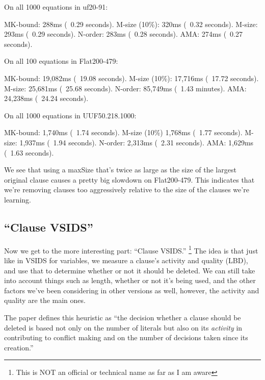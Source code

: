 \documentclass[../main.tex]{subfiles}
\begin{document}
\begin{FVerbatim}
On all 1000 equations in uf20-91:

MK-bound:       288ms (~0.29 seconds).
M-size (10\%):  320ms (~0.32 seconds).
M-size:         293ms (~0.29 seconds).
N-order:        283ms (~0.28 seconds).
AMA:            274ms (~0.27 seconds).

On all 100 equations in Flat200-479:

MK-bound:       19,082ms (~19.08 seconds).
M-size (10\%):  17,716ms (~17.72 seconds).
M-size:         25,681ms (~25.68 seconds).
N-order:        85,749ms (~1.43 minutes).
AMA:            24,238ms (~24.24 seconds).

On all 1000 equations in UUF50.218.1000:

MK-bound:       1,740ms (~1.74 seconds).
M-size (10\%)   1,768ms (~1.77 seconds).
M-size:         1,937ms (~1.94 seconds).
N-order:        2,313ms (~2.31 seconds).
AMA:            1,629ms (~1.63 seconds).
\end{FVerbatim}
\noindent
We see that using a maxSize that's twice as large as the size of the largest original clause
causes a pretty big slowdown on Flat200-479. This indicates that we're removing clauses 
too aggressively relative to the size of the clauses we're learning.

\subsection{``Clause VSIDS''}

Now we get to the more interesting part: ``Clause VSIDS.''
\footnote{This is NOT an official or technical name as far as I am aware}
The idea is that just like in VSIDS for variables, we measure a clause's activity
and quality (LBD), and use that to determine whether or not it should be deleted. 
We can still take into account things such as length, whether or not it's being used, 
and the other factors we've been considering in other versions as well, however, the 
activity and quality are the main ones.

The paper defines this heuristic as ``the decision whether a clause should be 
deleted is based not only on the number of literals but also on its \textit{activity} in 
contributing to conflict making and on the number of decisions taken since its creation.''
\end{document}
